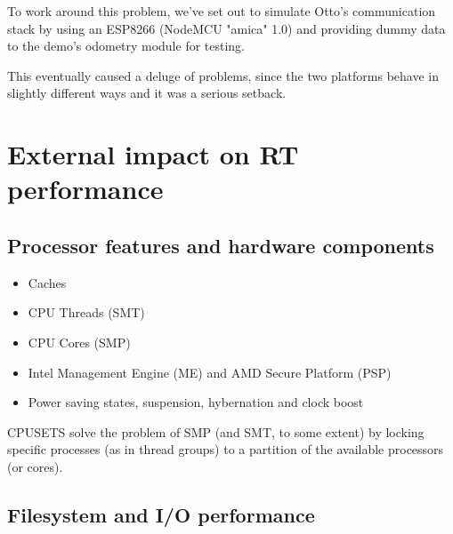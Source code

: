 \documentclass[a4paper,12pt]{report}
\begin{document}
To work around this problem, we've set out to simulate Otto's communication stack by using an ESP8266 (NodeMCU "amica" 1.0) and providing dummy data to the demo's odometry module for testing. 

This eventually caused a deluge of problems, since the two platforms behave in slightly different ways and it was a serious setback.

\section{External impact on RT performance}

\subsection{Processor features and hardware components}
\begin{itemize}
    \item Caches
    \item CPU Threads (SMT)
    \item CPU Cores (SMP)
    \item Intel Management Engine (ME) and AMD Secure Platform (PSP)
    \item Power saving states, suspension, hybernation and clock boost
\end{itemize}

CPUSETS solve the problem of SMP (and SMT, to some extent) by locking specific processes (as in thread groups) to a partition of the available processors (or cores).

\subsection{Filesystem and I/O performance}

\printbibliography
\end{document}

